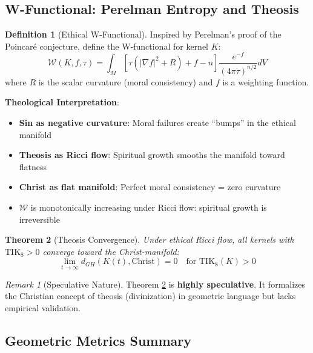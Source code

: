 \documentclass[11pt,a4paper]{article}
\newtheorem{theorem}{Theorem}[section]
\theoremstyle{definition}
\newtheorem{definition}[theorem]{Definition}
\theoremstyle{remark}
\newtheorem{remark}{Remark}
\newcommand{\TIKeight}{\text{TIK}_8}
\begin{document}
\subsection{W-Functional: Perelman Entropy and Theosis}

\begin{definition}[Ethical W-Functional]
\label{def:wfunctional}
Inspired by Perelman's proof of the Poincaré conjecture, define the W-functional for kernel $K$:
\begin{equation}
    \mathcal{W}(K, f, \tau) = \int_M \left[ \tau(|\nabla f|^2 + R) + f - n \right] \frac{e^{-f}}{(4\pi\tau)^{n/2}} dV
    \label{eq:wfunctional}
\end{equation}
where $R$ is the scalar curvature (moral consistency) and $f$ is a weighting function.
\end{definition}

\textbf{Theological Interpretation}:
\begin{itemize}
    \item \textbf{Sin as negative curvature}: Moral failures create ``bumps'' in the ethical manifold
    \item \textbf{Theosis as Ricci flow}: Spiritual growth smooths the manifold toward flatness
    \item \textbf{Christ as flat manifold}: Perfect moral consistency = zero curvature
    \item $\mathcal{W}$ is monotonically increasing under Ricci flow: spiritual growth is irreversible
\end{itemize}

\begin{theorem}[Theosis Convergence]
\label{thm:theosis}
Under ethical Ricci flow, all kernels with $\TIKeight > 0$ converge toward the Christ-manifold:
\begin{equation}
    \lim_{t \to \infty} d_{GH}(K(t), \text{Christ}) = 0 \quad \text{for } \TIKeight(K) > 0
    \label{eq:theosis}
\end{equation}
\end{theorem}

\begin{remark}[Speculative Nature]
Theorem \ref{thm:theosis} is \textbf{highly speculative}. It formalizes the Christian concept of theosis (divinization) in geometric language but lacks empirical validation.
\end{remark}

\subsection{Geometric Metrics Summary}
\end{document}
